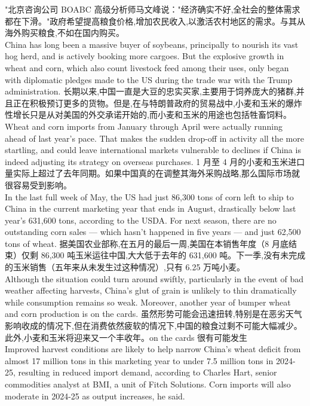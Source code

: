 \documentclass[a4paper,12pt]{article}
\begin{document}
"北京咨询公司 BOABC 高级分析师马文峰说："经济确实不好,全社会的整体需求都在下滑。"政府希望提高粮食价格,增加农民收入,以激活农村地区的需求。与其从海外购买粮食,不如在国内购买。
\\China has long been a massive buyer of soybeans, principally to nourish its vast hog herd, and is actively booking more cargoes. But the explosive growth in wheat and corn, which also count livestock feed among their uses, only began with diplomatic pledges made to the US during the trade war with the Trump administration.
长期以来,中国一直是大豆的忠实买家,主要用于饲养庞大的猪群,并且正在积极预订更多的货物。但是,在与特朗普政府的贸易战中,小麦和玉米的爆炸性增长只是从对美国的外交承诺开始的,而小麦和玉米的用途也包括牲畜饲料。
\\Wheat and corn imports from January through April were actually running ahead of last year's pace. That makes the sudden drop-off in activity all the more startling, and could leave international markets vulnerable to declines if China is indeed adjusting its strategy on overseas purchases.
1 月至 4 月的小麦和玉米进口量实际上超过了去年同期。如果中国真的在调整其海外采购战略,那么国际市场就很容易受到影响。
\\In the last full week of May, the US had just 86,300 tons of corn left to ship to China in the current marketing year that ends in August, drastically below last year's 631,600 tons, according to the USDA. For next season, there are no outstanding corn sales — which hasn't happened in five years — and just 62,500 tons of wheat.
据美国农业部称,在五月的最后一周,美国在本销售年度（8 月底结束）仅剩 86,300 吨玉米运往中国,大大低于去年的 631,600 吨。下一季,没有未完成的玉米销售（五年来从未发生过这种情况）,只有 6.25 万吨小麦。
\\Although the situation could turn around swiftly, particularly in the event of bad weather affecting harvests, China's glut of grain is unlikely to thin dramatically while consumption remains so weak. Moreover, another year of bumper wheat and corn production is on the cards.
虽然形势可能会迅速扭转,特别是在恶劣天气影响收成的情况下,但在消费依然疲软的情况下,中国的粮食过剩不可能大幅减少。此外,小麦和玉米将迎来又一个丰收年。on the cards 很有可能发生
\\Improved harvest conditions are likely to help narrow China's wheat deficit from almost 17 million tons in this marketing year to under 7.5 million tons in 2024-25, resulting in reduced import demand, according to Charles Hart, senior commodities analyst at BMI, a unit of Fitch Solutions. Corn imports will also moderate in 2024-25 as output increases, he said.
\end{document}
